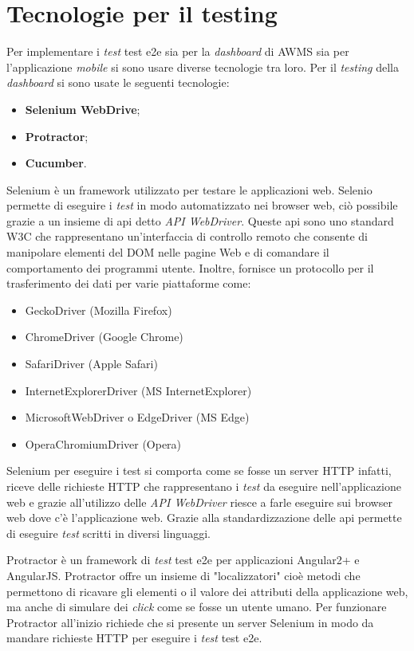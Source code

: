 \section{Tecnologie per il testing}
Per implementare i \emph{test} \gls{test e2e} sia per la \emph{dashboard} di \gls{AWMS} sia per l'applicazione \emph{mobile} si sono usare diverse tecnologie tra loro. Per il \emph{testing} della \emph{dashboard} si sono usate le seguenti tecnologie:
\begin{itemize}
	\item \textbf{Selenium WebDrive};
	\item \textbf{Protractor};
	\item \textbf{Cucumber}.
\end{itemize}
Selenium è un framework utilizzato per testare le applicazioni web. Selenio permette di eseguire i \emph{test} in modo automatizzato nei browser web, ciò possibile grazie a un insieme di \gls{api}\ap{[g]} detto \emph{API WebDriver}. Queste \gls{api}\ap{[g]} sono uno standard W3C che rappresentano un'interfaccia di controllo remoto che consente di manipolare elementi del DOM nelle pagine Web e di comandare il comportamento dei programmi utente. Inoltre, fornisce un protocollo per il trasferimento dei dati per varie piattaforme come:
\begin{itemize}
	\item GeckoDriver (Mozilla Firefox)
	\item ChromeDriver (Google Chrome)
	\item SafariDriver (Apple Safari)
	\item InternetExplorerDriver (MS InternetExplorer)
	\item MicrosoftWebDriver o EdgeDriver (MS Edge)
	\item OperaChromiumDriver (Opera)
\end{itemize}
Selenium per eseguire i test si comporta come se fosse un server HTTP infatti, riceve delle richieste HTTP che rappresentano i \emph{test} da eseguire nell'applicazione web e grazie all'utilizzo delle \emph{API WebDriver} riesce a farle eseguire sui browser web dove c'è l'applicazione web. Grazie alla standardizzazione delle \gls{api}\ap{[g]} permette di eseguire \emph{test} scritti in diversi linguaggi.

Protractor è un framework di \emph{test} \gls{test e2e} per applicazioni Angular2+ e AngularJS. Protractor offre un insieme di "localizzatori" cioè metodi che permettono di ricavare gli elementi o il valore dei attributi della applicazione web, ma anche di simulare dei \emph{click} come se fosse un utente umano. Per funzionare Protractor all'inizio richiede che si presente un server Selenium in modo da mandare richieste HTTP per eseguire i \emph{test} \gls{test e2e}.

